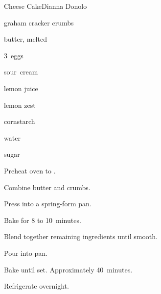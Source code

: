 \begin{recipe}{Cheese Cake}{Dianna Donolo}{}

\begin{ingredients}
\item \C{2\half} graham cracker crumbs
\item \C{\half} butter, melted
\item 3~eggs
\item {} 
\item {} sour~cream
\item {} 
\item {} lemon juice
\item {} lemon zest
\item {} cornstarch
\item {} water
\item {} sugar
\end{ingredients}

\begin{directions}
\item Preheat oven to .
\item Combine butter and crumbs.
\item Press into a spring-form pan.
\item Bake for 8 to 10~minutes.
\item Blend together remaining ingredients until smooth.
\item Pour into pan.
\item Bake until set. Approximately 40~minutes.
\item Refrigerate overnight.
\end{directions}

\end{recipe}
